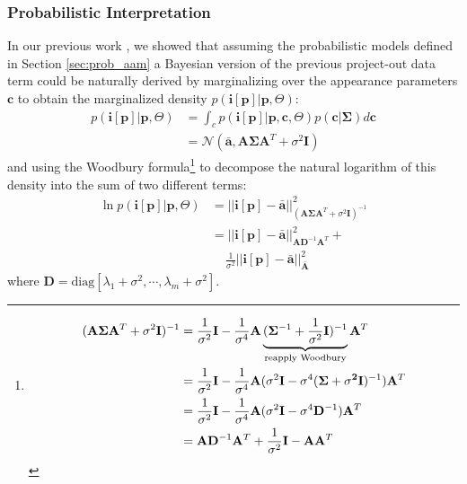 \subsubsection*{Probabilistic Interpretation}
\label{sec:po_pi}
In our previous work \cite{Alabort2014}, we showed that assuming the probabilistic models defined in Section \ref{sec:prob_aam} a Bayesian version of the previous project-out data term could be naturally derived by marginalizing over the appearance parameters $\mathbf{c}$ to obtain the marginalized density $p(\mathbf{i}[\mathbf{p}] | \mathbf{p}, \Theta)$:
\begin{equation}
    \begin{aligned}
        p(\mathbf{i}[\mathbf{p}] | \mathbf{p}, \Theta) & = \int_c p(\mathbf{i}[\mathbf{p}] | \mathbf{p}, \mathbf{c}, \Theta) p(\mathbf{c}|\mathbf{\Sigma}) d\mathbf{c} 
        \\
        & = \mathcal{N}(\bar{\mathbf{a}}, \mathbf{A}\mathbf{\Sigma}\mathbf{A}^T + \sigma^2 \mathbf{I})
    \end{aligned}
    \label{eq:marginal}
\end{equation}
and using the Woodbury formula\footnote{
\begin{equation*}
    \begin{aligned}
    \small
    	(\mathbf{A} \mathbf{\Sigma} \mathbf{A}^T + \sigma^2 \mathbf{I})^{-1} & = \frac{1}{\sigma^2} \mathbf{I} - \frac{1}{\sigma^4} \mathbf{A} \underbrace{(\mathbf{\Sigma}^{-1} + \frac{1}{\sigma^2}\mathbf{I})^{-1}}_{\textrm{reapply Woodbury}} \mathbf{A}^T
    	\\
    	& = \frac{1}{\sigma^2} \mathbf{I} - \frac{1}{\sigma^4} \mathbf{A} (\sigma^2\mathbf{I} - \sigma^4(\mathbf{\Sigma + \sigma^2\mathbf{I}})^{-1}) \mathbf{A}^T
    	\\
    	& = \frac{1}{\sigma^2} \mathbf{I} - \frac{1}{\sigma^4} \mathbf{A} (\sigma^2\mathbf{I} - \sigma^4\mathbf{D}^{-1}) \mathbf{A}^T
    	\\
    	& = \mathbf{A}\mathbf{D}^{-1}\mathbf{A}^T + \frac{1}{\sigma^2} \mathbf{I} - \mathbf{A}\mathbf{A}^T
    \end{aligned}
    \label{eq:woodbury}
\end{equation*}} \cite{Woodbury1950} to decompose the natural logarithm of this density into the sum of two different terms:
\begin{equation}
    \begin{aligned}
        \ln p(\mathbf{i}[\mathbf{p}] | \mathbf{p}, \Theta) & = || \mathbf{i}[\mathbf{p}] - \mathbf{\bar{a}} ||^2_{(\mathbf{A}\mathbf{\Sigma}\mathbf{A}^T + \sigma^2 \mathbf{I})^{-1}}
        \\
        & = || \mathbf{i}[\mathbf{p}] - \mathbf{\bar{a}} ||^2_{\mathbf{A}\mathbf{D}^{-1}\mathbf{A}^T} + 
        \\
        & \quad \, \frac{1}{\sigma^2}|| \mathbf{i}[\mathbf{p}] - \mathbf{\bar{a}} ||^2_{\bar{\mathbf{A}}}
    \end{aligned}
    \label{eq:prob_po}
\end{equation}
where $\mathbf{D} = \textrm{diag}[\lambda_1 + \sigma^2, \cdots, \lambda_m + \sigma^2]$.

